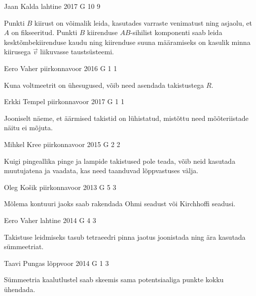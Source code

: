 \documentclass[11pt]{article}
\begin{document}
{%
{Jaan Kalda} %
{lahtine} %
{2017} %
{G 10} %
{9} %
{

\ifHint
Punkti $B$ kiirust on võimalik leida, kasutades varraste venimatust ning asjaolu, et $A$ on fikseeritud. Punkti $B$ kiirenduse $AB$-sihilist komponenti saab leida kesktõmbekiirenduse kaudu ning kiirenduse suuna määramiseks on kasulik minna kiirusega $\vec{v}$ liikuvasse taustsüsteemi.
\fi
}

{Eero Vaher} %
{piirkonnavoor} %
{2016} %
{G 1} %
{1} %
{

\ifHint
Kuna voltmeetrit on ühesugused, võib need asendada takistustega $R$.
\fi
}

{Erkki Tempel} %
{piirkonnavoor} %
{2017} %
{G 1} %
{1} %
{

\ifHint
Jooniselt näeme, et äärmised takistid on lühistatud, mistõttu need mõõteriistade näitu ei mõjuta.
\fi
}

{Mihkel Kree} %
{piirkonnavoor} %
{2015} %
{G 2} %
{2} %
{

\ifHint
Kuigi pingeallika pinge ja lampide takistused pole teada, võib neid kasutada muutujatena ja vaadata, kas need taanduvad lõppvastuses välja.
\fi
}

{Oleg Košik} %
{piirkonnavoor} %
{2013} %
{G 5} %
{3} %
{

\ifHint
Mõlema kontuuri jaoks saab rakendada Ohmi seadust või Kirchhoffi seadusi.
\fi
}

{Eero Vaher} %
{lahtine} %
{2014} %
{G 4} %
{3} %
{

\ifHint
Takistuse leidmiseks tasub tetraeedri pinna jaotus joonistada ning ära kasutada sümmeetriat.
\fi
}

{Taavi Pungas} %
{lõppvoor} %
{2014} %
{G 1} %
{3} %
{

\ifHint
Sümmeetria kaalutlustel saab skeemis sama potentsiaaliga punkte kokku ühendada.
\fi
}

}
\end{document}
